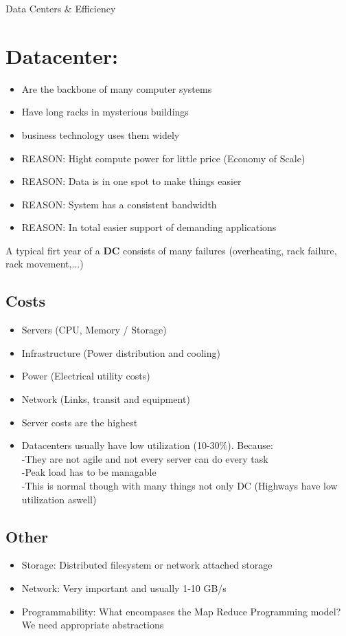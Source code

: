 \documentclass[a4paper]{article}
\begin{document}
{\huge Data Centers \& Efficiency\\}
\section{Datacenter:}
\begin{itemize}
\setlength{\itemsep}{-4pt}
\item Are the backbone of many computer systems
\item Have long racks in mysterious buildings
\item business technology uses them widely
\item REASON: Hight compute power for little price (Economy of Scale)
\item REASON: Data is in one spot to make things easier
\item REASON: System has a consistent bandwidth
\item REASON: In total easier support of demanding applications
\end{itemize}
A typical firt year of a {\bf DC} consists of many failures (overheating, rack failure, rack movement,...)

\subsection{Costs}
\begin{itemize}
\setlength{\itemsep}{-4pt}
\item Servers (CPU, Memory / Storage)
\item Infrastructure (Power distribution and cooling)
\item Power (Electrical utility costs)
\item Network (Links, transit and equipment)
\item Server costs are the highest
\item Datacenters usually have low utilization (10-30\%). Because:\\
	-They are not agile and not every server can do every task\\
	-Peak load has to be managable\\
	-This is normal though with many things not only DC (Highways have low utilization aswell)
\end{itemize}

\subsection{Other}
\begin{itemize}
\setlength{\itemsep}{-4pt}
\item Storage: Distributed filesystem or network attached storage
\item Network: Very important and usually 1-10 GB/s
\item Programmability: What encompases the Map Reduce Programming model? We need appropriate abstractions
\end{itemize}
\end{document}

